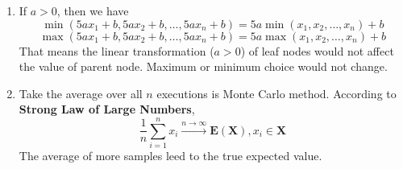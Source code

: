 \documentclass{article}
\begin{document}
\begin{enumerate}
\item

If $a>0$, then we have
$$\min(5ax_1+b,5ax_2+b,\dots,5ax_n+b) = 5a\min(x_1,x_2,\dots,x_n)+b$$
$$\max(5ax_1+b,5ax_2+b,\dots,5ax_n+b) = 5a\max(x_1,x_2,\dots,x_n)+b$$
That means the linear transformation ($a>0$) of leaf nodes would not affect the value of parent node. Maximum or minimum choice would not change.

\item

Take the average over all $n$ executions is Monte Carlo method. According to \textbf{Strong Law of Large Numbers},
$$\frac{1}{n}\sum_{i=1}^n x_i \xrightarrow[]{n\rightarrow\infty} \mathbf{E}(\mathbf{X}), x_i\in\mathbf{X}$$
The average of more samples leed to the true expected value.

\end{enumerate}
\end{document}
